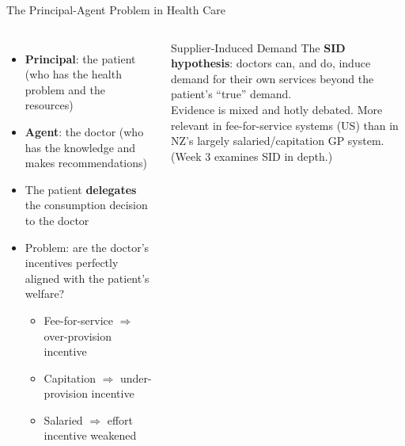 \documentclass[aspectratio=169, 12pt]{beamer}
\begin{document}
\begin{frame}{The Principal-Agent Problem in Health Care}
  \begin{columns}
      \begin{itemize}
        \item \textbf{Principal}: the patient (who has the health problem and the resources)
        \item \textbf{Agent}: the doctor (who has the knowledge and makes recommendations)
        \item The patient \textbf{delegates} the consumption decision to the doctor
        \item Problem: are the doctor's incentives perfectly aligned with the patient's welfare?
        \begin{itemize}
          \item Fee-for-service $\Rightarrow$ over-provision incentive
          \item Capitation $\Rightarrow$ under-provision incentive
          \item Salaried $\Rightarrow$ effort incentive weakened
        \end{itemize}
      \end{itemize}
      \begin{alertblock}{Supplier-Induced Demand}
        The \textbf{SID hypothesis}: doctors can, and do, induce demand for their own services
        beyond the patient's ``true'' demand.\\[0.3em]
        Evidence is mixed and hotly debated. More relevant in fee-for-service systems (US) than
        in NZ's largely salaried/capitation GP system.\\[0.3em]
        (Week 3 examines SID in depth.)
      \end{alertblock}
  \end{columns}
\end{frame}
\end{document}
